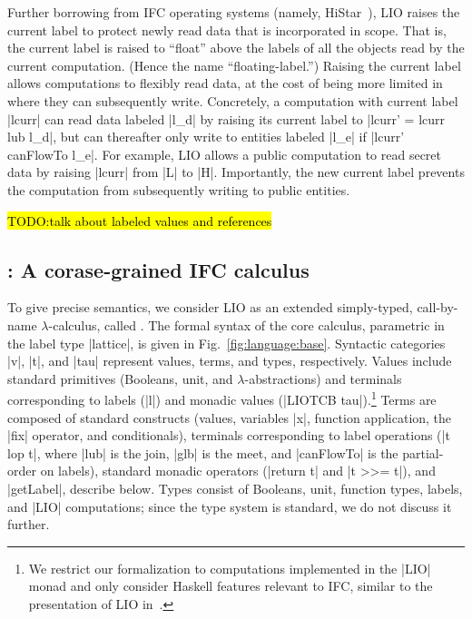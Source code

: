Further borrowing from IFC operating systems (namely,
HiStar~\cite{zeldovich:histar}), LIO raises the current label to
protect newly read data that is incorporated in scope.
%
That is, the current label is raised to ``float'' above the labels of
all the objects read by the current computation.
(Hence the name ``floating-label.'')
% 
Raising the current label allows computations to flexibly read data,
at the cost of being more limited in where they can subsequently
write.
%
Concretely, a computation with current label |lcurr| can read data
labeled |l_d| by raising its current label to |lcurr' = lcurr lub
l_d|, but can thereafter only write to entities labeled |l_e| if
|lcurr' canFlowTo l_e|.
%
For example, LIO allows a public computation to read secret data by
raising |lcurr| from |L| to |H|. Importantly, the new current label
prevents the computation from subsequently writing to public entities.

\hl{TODO:talk about labeled values and references}
 
\subsection{\lio: A corase-grained IFC calculus}
 
To give precise semantics, we consider LIO as an extended
simply-typed, call-by-name $\lambda$-calculus, called \lio.
%
The formal syntax of the core \lio{} calculus, parametric in the label
type |lattice|, is given in Fig.~\ref{fig:language:base}.
%
Syntactic categories |v|, |t|, and |tau| represent values, terms, and
types, respectively.
%
Values include standard primitives (Booleans, unit,
and $\lambda$-abstractions) and terminals corresponding to labels
(|l|) and monadic values (|LIOTCB tau|).\footnote{
We restrict our formalization to computations implemented in the |LIO|
monad and only consider Haskell features relevant to IFC, similar to
the presentation of LIO in~.
}
%
Terms are composed of standard constructs (values, variables |x|,
function application, the |fix| operator, and conditionals), terminals
corresponding to label operations (|t lop t|, where |lub| is the join,
|glb| is the meet, and |canFlowTo| is the partial-order on labels),
standard monadic operators (|return t| and |t >>= t|), and |getLabel|,
describe below.
%
Types consist of Booleans, unit, function types, labels, and |LIO|
computations; since the \lio{} type system is standard, we do not
discuss it further.

